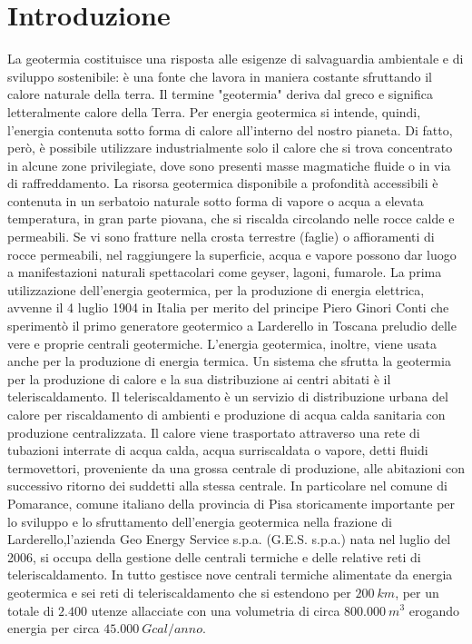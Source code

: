 \documentclass[laurea,oneside,11pt]{USiena_tesiLM}
\begin{document}
\chapter*{Introduzione}
La geotermia costituisce una risposta alle esigenze di salvaguardia ambientale e di sviluppo sostenibile: è una fonte che lavora in maniera costante sfruttando il calore naturale della terra.
Il termine "geotermia" deriva dal greco e significa letteralmente calore della Terra. Per energia geotermica si intende, quindi, l'energia contenuta sotto forma di calore all'interno del nostro pianeta. Di fatto, però, è possibile utilizzare industrialmente solo il calore che si trova concentrato in alcune zone privilegiate, dove sono presenti masse magmatiche fluide o in via di raffreddamento. La risorsa geotermica disponibile a profondità accessibili è contenuta in un serbatoio naturale sotto forma di vapore o acqua a elevata temperatura, in gran parte piovana, che si riscalda circolando nelle rocce calde e permeabili. Se vi sono fratture nella crosta terrestre (faglie) o affioramenti di rocce permeabili, nel raggiungere la superficie, acqua e vapore possono dar luogo a manifestazioni naturali spettacolari come geyser, lagoni, fumarole.
La prima utilizzazione dell'energia geotermica, per la produzione di energia elettrica, avvenne il 4 luglio 1904 in Italia per merito del principe Piero Ginori Conti che sperimentò il primo generatore geotermico a Larderello in Toscana preludio delle vere e proprie centrali geotermiche. 
L'energia geotermica, inoltre, viene usata anche per la produzione di energia termica. Un sistema che sfrutta la geotermia per la produzione di calore e la sua distribuzione  ai centri abitati è il teleriscaldamento. Il teleriscaldamento è  un  servizio  di  distribuzione  urbana  del calore per  riscaldamento di ambienti e produzione di acqua calda sanitaria con produzione centralizzata. Il calore viene trasportato attraverso una rete di tubazioni interrate di acqua calda, acqua surriscaldata o vapore, detti fluidi termovettori, proveniente da una grossa centrale di produzione, alle abitazioni con successivo ritorno dei suddetti alla stessa centrale.
In particolare nel comune di Pomarance, comune italiano della provincia di Pisa storicamente importante per lo sviluppo e lo sfruttamento dell'energia geotermica nella frazione di Larderello,l'azienda Geo Energy Service s.p.a. (G.E.S. s.p.a.) nata nel luglio del 2006, si occupa della gestione delle centrali termiche e delle relative reti di teleriscaldamento. In tutto gestisce nove centrali termiche alimentate da energia geotermica e sei reti di teleriscaldamento che si estendono per $200 \ km$, per un totale di $2.400$ utenze allacciate con una volumetria di circa $800.000 \ m^3$ erogando energia per circa $45.000 \ Gcal/anno$. 
\end{document}
